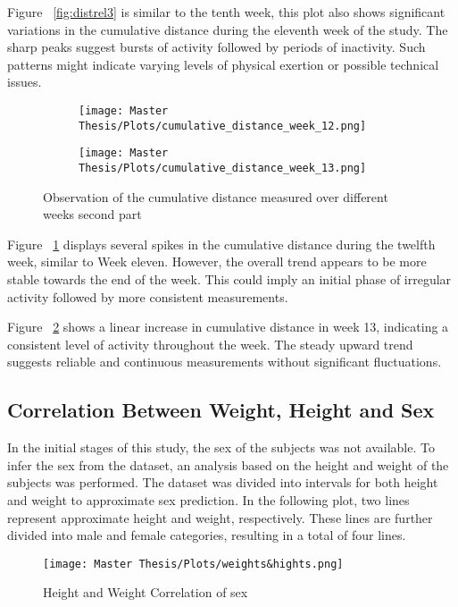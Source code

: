 Figure ~\ref{fig:distrel3} is similar to the tenth week, this plot also shows significant variations in the cumulative distance during the eleventh week of the study. The sharp peaks suggest bursts of activity followed by periods of inactivity. Such patterns might indicate varying levels of physical exertion or possible technical issues.

\FloatBarrier
\begin{figure}[h!]
  \centering
  \begin{subfigure}{.55\textwidth}
    \centering
    \texttt{[image: Master Thesis/Plots/cumulative\_distance\_week\_12.png]}
    \caption{}
    \label{fig:distrel4}
  \end{subfigure}%
  \begin{subfigure}{.55\textwidth}
    \centering
    \texttt{[image: Master Thesis/Plots/cumulative\_distance\_week\_13.png]}
    \caption{}
    \label{fig:distrel5}
  \end{subfigure}
  \caption{Observation of the cumulative distance measured over different weeks second part}
    \label{fig:distcumsecondpart}
\end{figure}
\FloatBarrier

Figure ~\ref{fig:distrel4} displays several spikes in the cumulative distance during the twelfth week, similar to Week eleven. However, the overall trend appears to be more stable towards the end of the week. This could imply an initial phase of irregular activity followed by more consistent measurements.

Figure ~\ref{fig:distrel5} shows a linear increase in cumulative distance in week 13, indicating a consistent level of activity throughout the week. The steady upward trend suggests reliable and continuous measurements without significant fluctuations.

\newpage
\subsection{Correlation Between Weight, Height and Sex}

In the initial stages of this study, the sex of the subjects was not available. To infer the sex from the dataset, an analysis based on the height and weight of the subjects was performed. The dataset was divided into intervals for both height and weight to approximate sex prediction. In the following plot, two lines represent approximate height and weight, respectively. These lines are further divided into male and female categories, resulting in a total of four lines.

\FloatBarrier
\begin{figure}[h!]
\centering
\texttt{[image: Master Thesis/Plots/weights\&hights.png]}
\caption{Height and Weight Correlation of sex}
\label{fig:weightheightcorrsex}
\end{figure}
\FloatBarrier







